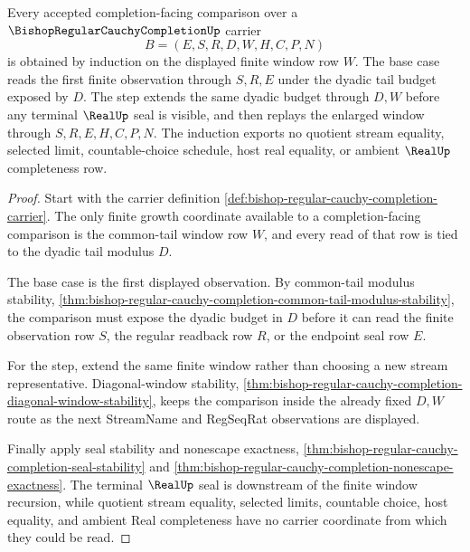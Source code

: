 \begin{theorem}
\label{thm:bishop-regular-cauchy-completion-window-induction}
Every accepted completion-facing comparison over a $\BishopRegularCauchyCompletionUp$ carrier
$$
B=(E,S,R,D,W,H,C,P,N)
$$
is obtained by induction on the displayed finite window row $W$. The base case reads the first finite observation through $S,R,E$ under the dyadic tail budget exposed by $D$. The step extends the same dyadic budget through $D,W$ before any terminal $\RealUp$ seal is visible, and then replays the enlarged window through $S,R,E,H,C,P,N$. The induction exports no quotient stream equality, selected limit, countable-choice schedule, host real equality, or ambient $\RealUp$ completeness row.
\end{theorem}
\begin{proof}
Start with the carrier definition \autoref{def:bishop-regular-cauchy-completion-carrier}. The only finite growth coordinate available to a completion-facing comparison is the common-tail window row $W$, and every read of that row is tied to the dyadic tail modulus $D$.

The base case is the first displayed observation. By common-tail modulus stability, \autoref{thm:bishop-regular-cauchy-completion-common-tail-modulus-stability}, the comparison must expose the dyadic budget in $D$ before it can read the finite observation row $S$, the regular readback row $R$, or the endpoint seal row $E$.

For the step, extend the same finite window rather than choosing a new stream representative. Diagonal-window stability, \autoref{thm:bishop-regular-cauchy-completion-diagonal-window-stability}, keeps the comparison inside the already fixed $D,W$ route as the next StreamName and RegSeqRat observations are displayed.

Finally apply seal stability and nonescape exactness, \autoref{thm:bishop-regular-cauchy-completion-seal-stability} and \autoref{thm:bishop-regular-cauchy-completion-nonescape-exactness}. The terminal $\RealUp$ seal is downstream of the finite window recursion, while quotient stream equality, selected limits, countable choice, host equality, and ambient Real completeness have no carrier coordinate from which they could be read.
\end{proof}

